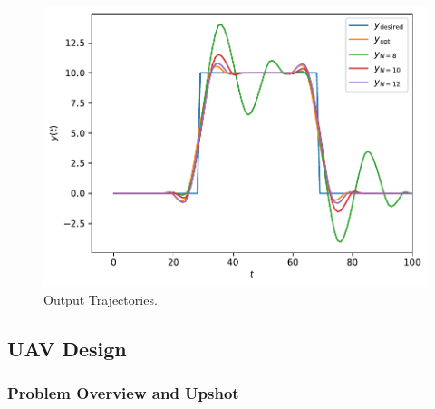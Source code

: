 \documentclass[12pt,reqno]{article}
\theoremstyle{definition}
\numberwithin{equation}{section}
\begin{document}
    \begin{figure}[htbp]
        \centering
        \includegraphics[width=\linewidth]{../examples/364b/364b_mpc_output.pdf}
        \caption{Output Trajectories.}
        \label{fig:364-hw7-traj-out}
    \end{figure}

\subsection{UAV Design}

\subsubsection*{Problem Overview and Upshot}
\end{document}
